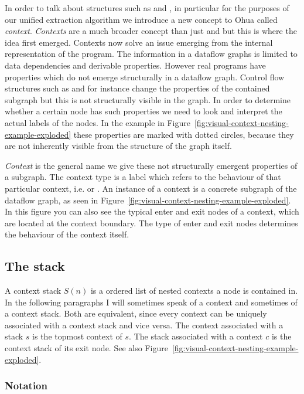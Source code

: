 In order to talk about structures such as \smap{} and \ifop{}, in particular for the purposes of our unified extraction algorithm we introduce a new concept to Ohua called \emph{context}.
\emph{Contexts} are a much broader concept than just \ifop{} and \smap{} but this is where the idea first emerged.
Contexts now solve an issue emerging from the internal representation of the program.
The information in a dataflow graphs is limited to data dependencies and derivable properties.
However real programs have properties which do not emerge structurally in a dataflow graph.
Control flow structures such as \smap{} and \ifop{} for instance change the properties of the contained subgraph but this is not structurally visible in the graph.
In order to determine whether a certain node has such properties we need to look and interpret the actual labels of the nodes.
In the example in Figure~\ref{fig:visual-context-nesting-example-exploded} these properties are marked with dotted circles, because they are not inherently visible from the structure of the graph itself.

\emph{Context} is the general name we give these not structurally emergent properties of a subgraph.
The context type is a label which refers to the behaviour of that particular context, i.e. \ifop{} or \smap{}.
An instance of a context is a concrete subgraph of the dataflow graph, as seen in Figure~\ref{fig:visual-context-nesting-example-exploded}.
In this figure you can also see the typical enter and exit nodes of a context, which are located at the context boundary.
The type of enter and exit nodes determines the behaviour of the context itself.

\subsection{The stack}

A context stack $S(n)$ is a ordered list of nested contexts a node is contained in.
In the following paragraphs I will sometimes speak of a context and sometimes of a context stack.
Both are equivalent, since every context can be uniquely associated with a context stack and vice versa.
The context associated with a stack $s$ is the topmost context of $s$.
The stack associated with a context $c$ is the context stack of its exit node.
See also Figure~\ref{fig:visual-context-nesting-example-exploded}.

\subsubsection{Notation}

